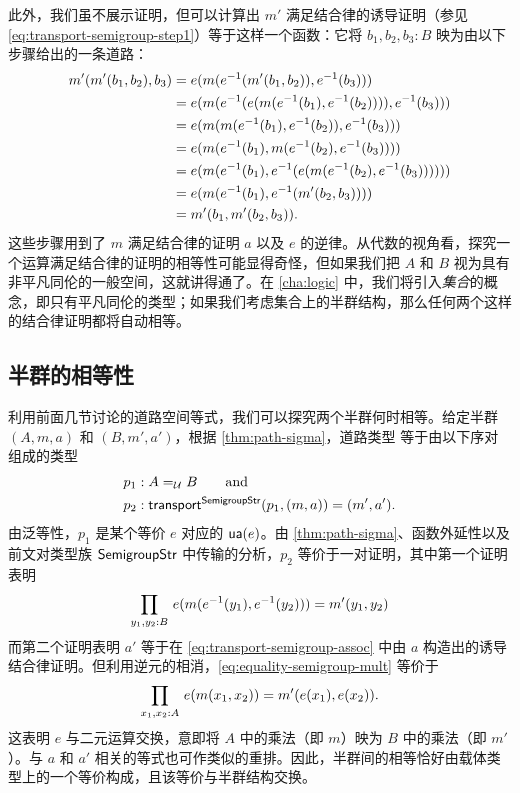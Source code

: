 此外，我们虽不展示证明，但可以计算出 $m'$ 满足结合律的诱导证明（参见 \eqref{eq:transport-semigroup-step1}）等于这样一个函数：它将
$b_1,b_2,b_3 : B$ 映为由以下步骤给出的一条道路：
\begin{equation}
  \label{eq:transport-semigroup-assoc}
  \begin{aligned}
    m'(m'(b_1,b_2),b_3)
    &= e(m(\mathord{{e}^{-1}}(m'(b_1,b_2)),\mathord{{e}^{-1}}(b_3))) \\
    &= e(m(\mathord{{e}^{-1}}(e(m(\mathord{{e}^{-1}}(b_1),\mathord{{e}^{-1}}(b_2)))),\mathord{{e}^{-1}}(b_3))) \\
    &= e(m(m(\mathord{{e}^{-1}}(b_1),\mathord{{e}^{-1}}(b_2)),\mathord{{e}^{-1}}(b_3))) \\
    &= e(m(\mathord{{e}^{-1}}(b_1),m(\mathord{{e}^{-1}}(b_2),\mathord{{e}^{-1}}(b_3)))) \\
    &= e(m(\mathord{{e}^{-1}}(b_1),\mathord{{e}^{-1}}(e(m(\mathord{{e}^{-1}}(b_2),\mathord{{e}^{-1}}(b_3)))))) \\
    &= e(m(\mathord{{e}^{-1}}(b_1),\mathord{{e}^{-1}}(m'(b_2,b_3)))) \\
    &= m'(b_1,m'(b_2,b_3)).
\end{aligned}
\end{equation}
这些步骤用到了 $m$ 满足结合律的证明 $a$ 以及 $e$ 的逆律。从代数的视角看，探究一个运算满足结合律的证明的相等性可能显得奇怪，但如果我们把 $A$ 和 $B$ 视为具有非平凡同伦的一般空间，这就讲得通了。在 \cref{cha:logic} 中，我们将引入\emph{集合}的概念，即只有平凡同伦的类型；如果我们考虑集合上的半群结构，那么任何两个这样的结合律证明都将自动相等。

\subsection{半群的相等性}
\label{sec:equality-semigroups}

利用前面几节讨论的道路空间等式，我们可以探究两个半群何时相等。给定半群 $(A,m,a)$ 和 $(B,m',a')$，根据 \cref{thm:path-sigma}，道路类型
等于由以下序对组成的类型
\begin{align*}
p_1 &: A =_{\mathcal{U}} B \qquad\text{and}\\
p_2 &: \mathsf{transport}^{\mathsf{SemigroupStr}}(p_1,(m,a)) = {(m',a')}.
\end{align*}
由泛等性，$p_1$ 是某个等价 $e$ 对应的 $\mathsf{ua}(e)$。由 \cref{thm:path-sigma}、函数外延性以及前文对类型族 $\mathsf{SemigroupStr}$ 中传输的分析，$p_2$ 等价于一对证明，其中第一个证明表明
\begin{equation} \label{eq:equality-semigroup-mult}
\prd{y_1,y_2:B} e(m(\opp{e}(y_1), \opp{e}(y_2))) = m'(y_1,y_2)
\end{equation}
而第二个证明表明 $a'$ 等于在 \eqref{eq:transport-semigroup-assoc} 中由 $a$ 构造出的诱导结合律证明。但利用逆元的相消，\eqref{eq:equality-semigroup-mult} 等价于
\[
\prd{x_1,x_2:A} e(m(x_1, x_2)) = m'(e(x_1),e(x_2)).
\]
这表明 $e$ 与二元运算交换，意即将 $A$ 中的乘法（即 $m$）映为 $B$ 中的乘法（即 $m'$）。与 $a$ 和 $a'$ 相关的等式也可作类似的重排。因此，半群间的相等恰好由载体类型上的一个等价构成，且该等价与半群结构交换。

